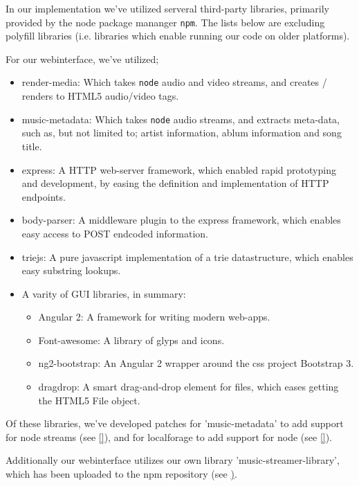 
In our implementation we've utilized serveral third-party libraries, primarily
provided by the node package mananger \verb|npm|. The lists below are excluding
polyfill libraries (i.e. libraries which enable running our code on older
platforms).

For our webinterface, we've utilized;
\begin{itemize}
\item render-media: Which takes \verb|node| audio and video streams, and
        creates / renders to HTML5 audio/video tags.
\item music-metadata: Which takes \verb|node| audio streams, and extracts
        meta-data, such as, but not limited to; artist information, ablum 
        information and song title.
\item express: A HTTP web-server framework, which enabled rapid prototyping and
        development, by easing the definition and implementation of HTTP endpoints.
\item body-parser: A middleware plugin to the express framework, which enables 
        easy access to POST endcoded information.
\item triejs: A pure javascript implementation of a trie datastructure, which 
        enables easy substring lookups.
\item A varity of GUI libraries, in summary:
\begin{itemize}
\item Angular 2: A framework for writing modern web-apps.
\item Font-awesome: A library of glyps and icons.
\item ng2-bootstrap: An Angular 2 wrapper around the css project Bootstrap 3.
\item dragdrop: A smart drag-and-drop element for files, which eases getting
        the HTML5 File object.
\end{itemize}
\end{itemize}
Of these libraries, we've developed patches for 'music-metadata' to add support
for node streams (see \ref{}), and for localforage to add support for node (see
\ref{}).

Additionally our webinterface utilizes our own library 'music-streamer-library',
which has been uploaded to the npm repository (see \href{}).

